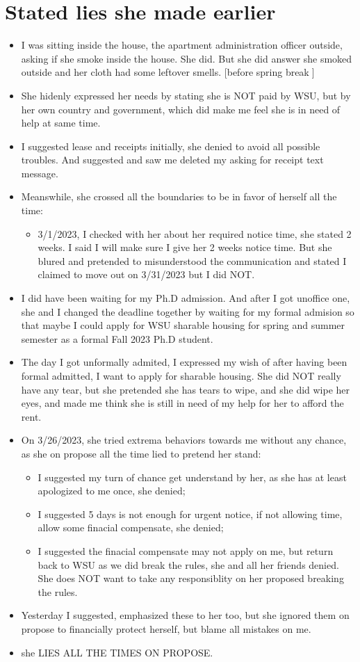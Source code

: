 \documentclass[9pt, b5paper]{article}
\begin{document}
\section{Stated lies she made earlier}
\label{sec-8}
\begin{itemize}
\item I was sitting inside the house, the apartment administration officer outside, asking if she smoke inside the house. She did. But she did answer she smoked outside and her cloth had some leftover smells. [before spring break]
\item She hidenly expressed her needs by stating she is NOT paid by WSU, but by her own country and government, which did make me feel she is in need of help at same time.
\item I suggested lease and receipts initially, she denied to avoid all possible troubles. And suggested and saw me deleted my asking for receipt text message.
\item Meanswhile, she crossed all the boundaries to be in favor of herself all the time: 
\begin{itemize}
\item 3/1/2023, I checked with her about her required notice time, she stated 2 weeks. I said I will make sure I give her 2 weeks notice time. But she blured and pretended to misunderstood the communication and stated I claimed to move out on 3/31/2023 but I did NOT.
\end{itemize}
\item I did have been waiting for my Ph.D admission. And after I got unoffice one, she and I changed the deadline together by waiting for my formal admision so that maybe I could apply for WSU sharable housing for spring and summer semester as a formal Fall 2023 Ph.D student.
\item The day I got unformally admited, I expressed my wish of after having been formal admitted, I want to apply for sharable housing. She did NOT really have any tear, but she pretended she has tears to wipe, and she did wipe her eyes, and made me think she is still in need of my help for her to afford the rent.
\item On 3/26/2023, she tried extrema behaviors towards me without any chance, as she on propose all the time lied to pretend her stand:
\begin{itemize}
\item I suggested my turn of chance get understand by her, as she has at least apologized to me once, she denied;
\item I suggested 5 days is not enough for urgent notice, if not allowing time, allow some finacial compensate, she denied;
\item I suggested the finacial compensate may not apply on me, but return back to WSU as we did break the rules, she and all her friends denied. She does NOT want to take any responsiblity on her proposed breaking the rules.
\end{itemize}
\item Yesterday I suggested, emphasized these to her too, but she ignored them on propose to financially protect herself, but blame all mistakes on me.
\item she LIES ALL THE TIMES ON PROPOSE.
\end{itemize}
\end{document}
